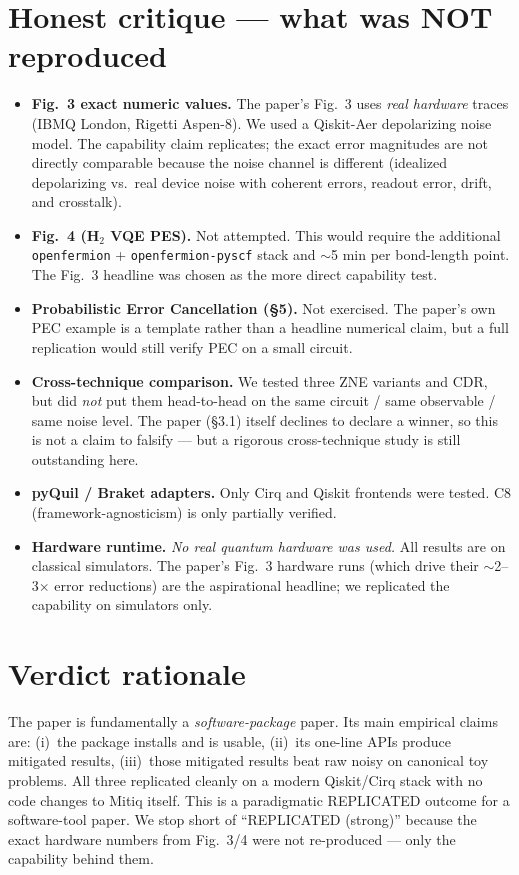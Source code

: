 \documentclass[11pt]{article}
\begin{document}
\section{Honest critique --- what was NOT reproduced}
\begin{itemize}
  \item \textbf{Fig.~3 exact numeric values.} The paper's Fig.~3 uses \emph{real hardware} traces (IBMQ London, Rigetti Aspen-8). We used a Qiskit-Aer depolarizing noise model. The capability claim replicates; the exact error magnitudes are not directly comparable because the noise channel is different (idealized depolarizing vs.\ real device noise with coherent errors, readout error, drift, and crosstalk).
  \item \textbf{Fig.~4 (H$_2$ VQE PES).} Not attempted. This would require the additional \texttt{openfermion} + \texttt{openfermion-pyscf} stack and $\sim$5 min per bond-length point. The Fig.~3 headline was chosen as the more direct capability test.
  \item \textbf{Probabilistic Error Cancellation (\S5).} Not exercised. The paper's own PEC example is a template rather than a headline numerical claim, but a full replication would still verify PEC on a small circuit.
  \item \textbf{Cross-technique comparison.} We tested three ZNE variants and CDR, but did \emph{not} put them head-to-head on the same circuit / same observable / same noise level. The paper (\S3.1) itself declines to declare a winner, so this is not a claim to falsify --- but a rigorous cross-technique study is still outstanding here.
  \item \textbf{pyQuil / Braket adapters.} Only Cirq and Qiskit frontends were tested. C8 (framework-agnosticism) is only partially verified.
  \item \textbf{Hardware runtime.} \emph{No real quantum hardware was used.} All results are on classical simulators. The paper's Fig.~3 hardware runs (which drive their $\sim$2--3$\times$ error reductions) are the aspirational headline; we replicated the capability on simulators only.
\end{itemize}

\section{Verdict rationale}
The paper is fundamentally a \emph{software-package} paper. Its main empirical claims are: (i)~the package installs and is usable, (ii)~its one-line APIs produce mitigated results, (iii)~those mitigated results beat raw noisy on canonical toy problems. All three replicated cleanly on a modern Qiskit/Cirq stack with no code changes to Mitiq itself. This is a paradigmatic REPLICATED outcome for a software-tool paper. We stop short of ``REPLICATED (strong)'' because the exact hardware numbers from Fig.~3/4 were not re-produced --- only the capability behind them.


\end{document}
